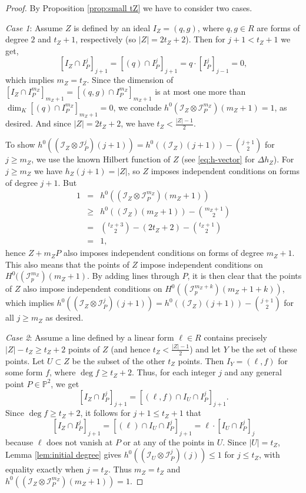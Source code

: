 \documentclass[12pt]{amsart}
\numberwithin{equation}{section}
\theoremstyle{definition}
\begin{document}
\begin{proof}
By Proposition \ref{prop:small tZ} we have to consider two cases.

\emph{Case 1}: Assume $Z$ is defined by an ideal $I_Z = (q, g)$, where $q, g\in R$ 
are forms of degree $2$ and  $t_Z+1$, respectively (so $|Z|=2t_Z+2$). Then for $j+1 < t_Z+1$ we get, 
\[
[I_Z \cap I_P^j]_{j+1} = [(q)\cap I_P^j]_{j+1} = q \cdot [I_P^j]_{j-1} = 0, 
\]
which implies $m_Z = t_Z$. Since the dimension of $[I_Z \cap I_P^{m_Z}]_{m_Z+1} = [(q, g) \cap I_P^{m_Z}]_{m_Z+1}$ 
is at most one more than $\dim_K [(q) \cap I_P^{m_Z}]_{m_Z+1} = 0$, we conclude  
$h^0(\mathcal I_Z \otimes \mathcal I_P^{m_Z})(m_Z + 1) = 1$, as desired. 
And since $|Z|=2t_Z+2$, we have $t_Z < \frac{|Z| - 1}{2}$. 

To show $h^0((\mathcal I_Z \otimes \mathcal I_P^j)(j+1))=h^0((\mathcal I_Z)(j+1))-\binom{j+1}{2}$
for $j\geq m_Z$, we use the known Hilbert function of $Z$ (see \eqref{eq:h-vector} for $\Delta h_Z$).
For $j\geq m_Z$ we have $h_Z(j+1)=|Z|$, so $Z$ imposes independent conditions on forms of degree $j+1$.
But 
\[
\begin{array}{rcl}
1 & = & h^0((\mathcal I_Z \otimes \mathcal I_P^{m_Z})(m_Z + 1)) \\ 
& \geq &  h^0((\mathcal I_Z)(m_Z + 1)) -\binom{m_Z+1}{2} \\
& = & \binom{t_Z+3}{2}-(2t_Z+2)-\binom{t_Z+1}{2} \\
& = & 1, 
\end{array}
\]
hence $Z+m_ZP$ also imposes independent conditions on
forms of degree $m_Z+1$. 
This also means that the points of $Z$ impose independent conditions on $H^0((\mathcal I_p^{m_Z})(m_Z+1)$. By adding lines through $P$, it is then clear that the points of $Z$ also impose independent conditions on $H^0((\mathcal I_p^{m_Z+k})(m_Z+1+k))$, which implies $h^0((\mathcal I_Z \otimes \mathcal I_P^{j})(j + 1)) = h^0((\mathcal I_Z)(j + 1))-\binom{j+1}{2}$ for all $j \geq m_Z$ as desired.

\bigskip

\emph{Case 2}: Assume a line defined by a linear form $\ell \in R$ contains precisely 
$|Z| - t_Z \ge t_Z + 2$ points of $Z$ (and hence $t_Z < \frac{|Z| - 1}{2}$) 
and let $Y$ be the set of these points. Let $U \subset Z$ be the subset of the other $t_Z$ points. 
Then $I_Y = (\ell, f)$ for some form $f$, where $\deg f \ge t_Z + 2$. Thus, for 
each integer $j$ and any general point $P \in { \ensuremath{\mathbb{P}}}^2$, we get
\[
[I_Z \cap I_P^j]_{j+1} = [(\ell, f) \cap I_U \cap I_P^j]_{j+1}. 
\]
Since $\deg f \ge t_Z + 2$, it follows for $j+1 \le t_Z + 1$ that
\[
[I_Z \cap I_P^j]_{j+1} = [(\ell) \cap I_U \cap I_P^j]_{j+1} = \ell \cdot [I_U \cap I_P^j]_{j}
\]
because $\ell$ does not vanish at $P$ or at any of the points in $U$. 
Since $|U| = t_Z$, Lemma \ref{lem:initial degree} gives 
$h^0((\mathcal I_U \otimes \mathcal I_P^j)(j)) \leq 1$ for $j\leq t_Z$, with equality exactly when $j=t_Z$. 
Thus $m_Z = t_Z$ and  $h^0((\mathcal I_Z \otimes \mathcal I_P^{m_Z})(m_Z + 1)) = 1$. 


\end{proof}
\end{document}
